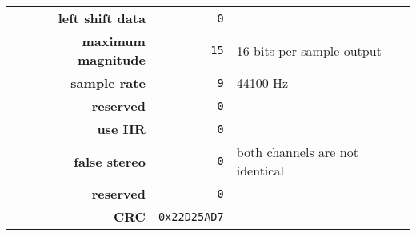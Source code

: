 {\begin{tabular}{rrl}
    \textbf{left shift data} & \texttt{0} \\
    \textbf{maximum magnitude} & \texttt{15} & 16 bits per sample output \\
    \textbf{sample rate} & \texttt{9} & 44100 Hz \\
    \textbf{reserved} & \texttt{0} \\
    \textbf{use IIR} & \texttt{0} \\
    \textbf{false stereo} & \texttt{0} & both channels are not identical \\
    \textbf{reserved} & \texttt{0} \\
    \textbf{CRC} & \texttt{0x22D25AD7} \\
  \end{tabular}
}

\clearpage

